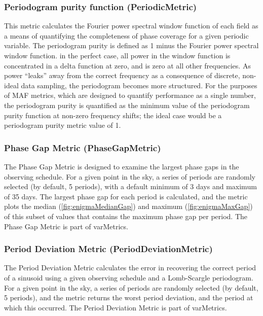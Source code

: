 \subsubsection{Periodogram purity function (PeriodicMetric)}

This metric calculates the Fourier power spectral window function of each field
\citep{1987AJ.....93..968R} as a means of quantifying the completeness of phase
coverage for a given periodic variable. The periodogram purity is defined as 1
minus the Fourier power spectral window function. in the perfect case, all
power in the window function is concentrated in a delta function at zero, and
is zero at all other frequencies. As power ``leaks'' away from the correct
frequency as a consequence of discrete, non-ideal data sampling, the
periodogram becomes more structured. For the purposes of MAF metrics, which are
designed to quantify performance as a single number, the periodogram purity is
quantified as the minimum value of the periodogram purity function at non-zero
frequency shifts; the ideal case would be a periodogram purity metric value of
1.

\subsubsection{Phase Gap Metric (PhaseGapMetric)}

The Phase Gap Metric is designed to examine the largest phase gaps in
the observing schedule. For a given point in the sky, a series of
periods are randomly selected (by default, 5 periods), with a default
minimum of 3 days and maximum of 35 days. The largest phase gap for each
period is calculated, and the metric plots the median
(\autoref{fig:enigmaMedianGap}) and maximum (\autoref{fig:enigmaMaxGap})
of this subset of values that contains the maximum phase gap per period.
The Phase Gap Metric is part of varMetrics.

\subsubsection{Period Deviation Metric (PeriodDeviationMetric)}

The Period Deviation Metric calculates the error in recovering the
correct period of a sinusoid using a given observing schedule and a
Lomb-Scargle periodogram. For a given point in the sky, a series of
periods are randomly selected (by default, 5 periods), and the metric
returns the worst period deviation, and the period at which this
occurred. The Period Deviation Metric is part of varMetrics.

